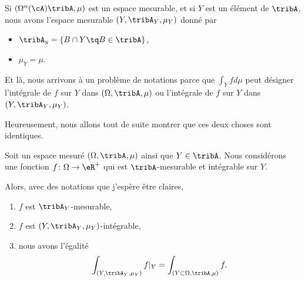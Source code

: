 \begin{normaltext}
    Si \( (\Omega^n(\cA)\tribA,\mu)\) est un espace mesurable, et si \( Y\) est un élément de \( \tribA\), nous avons l'espace mesurable \( (Y,\tribA_Y,\mu_Y)\) donné par
    \begin{itemize}
        \item \( \tribA_y=\{ B\cap Y\tq B\in \tribA \}\),
        \item \( \mu_Y=\mu\).
    \end{itemize}
    Et là, nous arrivons à un problème de notations parce que \( \int_Yfd\mu\) peut désigner l'intégrale de \( f\) sur \( Y\) dans \( (\Omega,\tribA,\mu)\) ou l'intégrale de \( f\) sur \( Y\) dans \( (Y,\tribA_Y,\mu_Y)\).

    Heureusement, nous allons tout de suite montrer que ces deux choses sont identiques.
\end{normaltext}


\begin{lemma}
    Soit un espace mesuré \( (\Omega,\tribA,\mu)\) ainsi que \( Y\in\tribA\). Nous considérons une fonction \( f\colon \Omega\to \eR^+\) qui est \( \tribA\)-mesurable et intégrable sur \( Y\).
    
    Alors, avec des notations que j'espère être claires,
    \begin{enumerate}
        \item
            \( f\) est \( \tribA_Y\)-mesurable,
        \item
            \( f\) est \( (Y,\tribA_Y,\mu_Y)\)-intégrable,
        \item
            nous avons l'égalité
    \begin{equation}
        \int_{(Y,\tribA_Y,\mu_Y)}f|_Y=\int_{(Y\subset \Omega,\tribA,\mu)}f.
    \end{equation}
    \end{enumerate}
\end{lemma}

